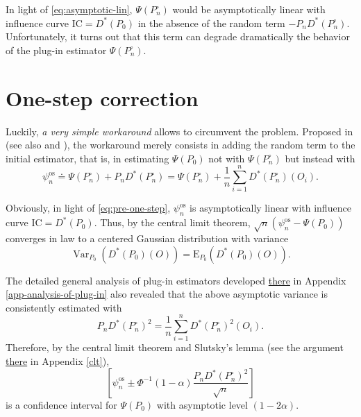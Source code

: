 \documentclass[
  11pt,
  openright,twoside]{book}
\DeclareMathOperator{\Var}{Var}
\newcommand{\defq}{\doteq}
\newcommand{\Exp}{\textrm{E}}
\newcommand{\IC}{\textrm{IC}}
\newcommand{\psinos}{\psi_{n}^{\textrm{os}}}
\newcommand{\Phat}{P^{\circ}}
\theoremstyle{definition}
\theoremstyle{definition}
\theoremstyle{definition}
\theoremstyle{definition}
\theoremstyle{remark}
\begin{document}
In light of \eqref{eq:asymptotic-lin}, \(\Psi(\Phat_{n})\) would be
asymptotically linear with influence curve \(\IC=D^{*}(P_{0})\) in the absence of
the random term \(-P_{n} D^*(\Phat_n)\). Unfortunately, it turns out that this
term can degrade dramatically the behavior of the plug-in estimator
\(\Psi(\Phat_{n})\).

\hypertarget{huber-one-step}{%
\section{One-step correction}\label{huber-one-step}}

Luckily, \emph{a very simple workaround} allows to circumvent the problem. Proposed
in \citep{LeCam69} (see also \citep{Pfanzagl82} and \citep{vdV98}), the workaround merely
consists in adding the random term to the initial estimator, that is, in
estimating \(\Psi(P_0)\) not with \(\Psi(\Phat_n)\) but instead with
\begin{equation}
\psinos  \defq  \Psi(\Phat_n)  +  P_{n} D^*(\Phat_n)  =  \Psi(\Phat_n)  +
\frac{1}{n} \sum_{i=1}^{n} D^*(\Phat_n)(O_{i}). \label{eq:def-one-step}
\end{equation}

Obviously, in light of \eqref{eq:pre-one-step}, \(\psinos\) is asymptotically
linear with influence curve \(\IC=D^{*}(P_{0})\). Thus, by the central limit
theorem, \(\sqrt{n} (\psinos - \Psi(P_0))\) converges in law to a centered
Gaussian distribution with variance
\begin{equation}
  \Var_{P_0}(D^{*}(P_{0})(O)) = \Exp_{P_0}(D^{*}(P_{0})(O)).
\end{equation}

The detailed general analysis of plug-in estimators
developed \protect\hyperlink{app-analysis-of-plug-in}{there} in Appendix
\ref{app-analysis-of-plug-in} also revealed that the above asymptotic
variance is consistently estimated with \begin{equation}    P_{n}
D^{*}(\Phat_{n})^{2}  =  \frac{1}{n}  \sum_{i=1}^{n}  D^*(\Phat_n)^{2}(O_{i}).
\end{equation} Therefore, by the central limit theorem and Slutsky's lemma
(see the argument \protect\hyperlink{clt}{there} in Appendix \ref{clt}), \begin{equation*}
\left[\psinos           \pm          \Phi^{-1}(1-\alpha)           \frac{P_{n}
D^{*}(\Phat_{n})^{2}}{\sqrt{n}}\right]   \end{equation*} is a confidence
interval for \(\Psi(P_0)\) with asymptotic level \((1-2\alpha)\).
\end{document}
